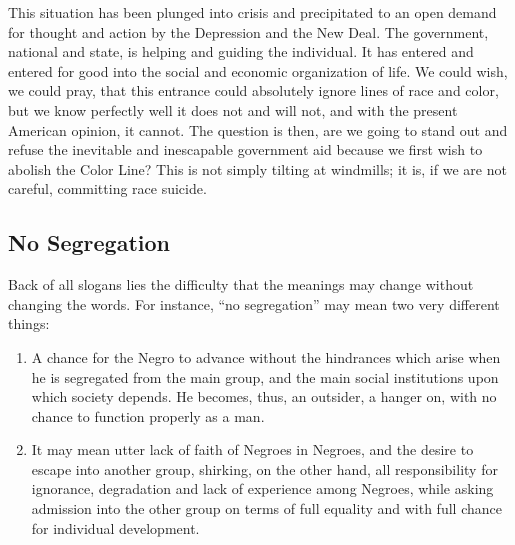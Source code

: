 \documentclass[letterpaper,10pt,english]{jupyterBook}
\begin{document}
\sphinxAtStartPar
This situation has been plunged into crisis and precipitated to an open demand for thought and action by the Depression and the New Deal. The government, national and state, is helping and guiding the individual. It has entered and entered for good into the social and economic organization of life. We could wish, we could pray, that this entrance could absolutely ignore lines of race and color, but we know perfectly well it does not and will not, and with the present American opinion, it cannot. The question is then, are we going to stand out and refuse the inevitable and inescapable government aid because we first wish to abolish the Color Line? This is not simply tilting at windmills; it is, if we are not careful, committing race suicide.


\subsection{No Segregation}
\label{\detokenize{Volumes/41/04/segregation_in_the_north:no-segregation}}
\sphinxAtStartPar
Back of all slogans lies the difficulty that the meanings may change without changing the words. For instance, “no segregation” may mean two very different things:
\begin{enumerate}
%
\item {} 
\sphinxAtStartPar
A chance for the Negro to advance without the hindrances which arise when he is segregated from the main group, and the main social institutions upon which society depends. He becomes, thus, an outsider, a hanger on, with no chance to function properly as a man.

\item {} 
\sphinxAtStartPar
It may mean utter lack of faith of Negroes in Negroes, and the desire to escape into another group, shirking, on the other hand, all responsibility for ignorance, degradation and lack of experience among Negroes, while asking admission into the other group on terms of full equality and with full chance for individual development.

\end{enumerate}
\end{document}
